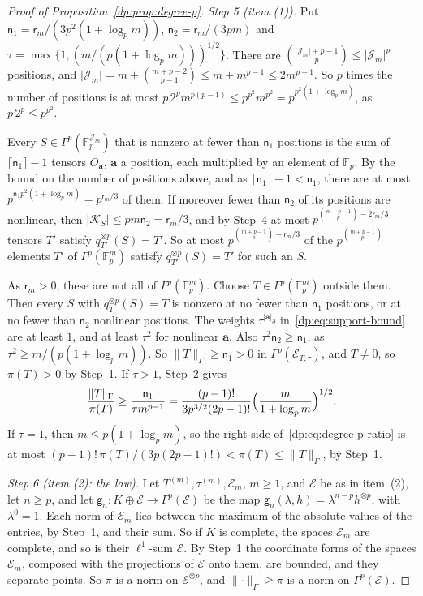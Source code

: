 \documentclass[11pt]{amsart}
\theoremstyle{definition}
\theoremstyle{remark}
\numberwithin{equation}{section}
\newcommand{\F}{\mathbb F}
\newcommand{\abs}[1]{\lvert #1\rvert}
\newcommand{\norm}[1]{\lVert #1\rVert}
\theoremstyle{plain}
\theoremstyle{definition}
\theoremstyle{plain}
\begin{document}
\begin{proof}[Proof of Proposition~\ref{dp:prop:degree-p}]
\emph{Step 5 (item (1)).} Put $\mathsf n_1=\mathsf r_m/(3p^2(1+\log_pm))$, $\mathsf n_2=\mathsf r_m/(3pm)$ and $\tau=\max\{1,(m/(p(1+\log_pm)))^{1/2}\}$. There are $\binom{\abs{\mathcal J_m}+p-1}p\le\abs{\mathcal J_m}^p$ positions, and $\abs{\mathcal J_m}=m+\binom{m+p-2}{p-1}\le m+m^{p-1}\le2m^{p-1}$. So $p$ times the number of positions is at most $p\,2^pm^{p(p-1)}\le p^{p^2}m^{p^2}=p^{p^2(1+\log_pm)}$, as $p\,2^p\le p^{p^2}$.

Every $S\in\Gamma^p(\F_p^{\mathcal J_m})$ that is nonzero at fewer than $\mathsf n_1$ positions is the sum of $\lceil\mathsf n_1\rceil-1$ tensors $O_{\mathbf a}$, $\mathbf a$ a position, each multiplied by an element of $\F_p$. By the bound on the number of positions above, and as $\lceil\mathsf n_1\rceil-1<\mathsf n_1$, there are at most $p^{\mathsf n_1p^2(1+\log_pm)}=p^{\mathsf r_m/3}$ of them. If moreover fewer than $\mathsf n_2$ of its positions are nonlinear, then $\abs{\mathcal K_S}\le pm\mathsf n_2=\mathsf r_m/3$, and by Step~4 at most $p^{\binom{m+p-1}p-2\mathsf r_m/3}$ tensors $T'$ satisfy $q_{T'}^{\otimes p}(S)=T'$. So at most $p^{\binom{m+p-1}p-\mathsf r_m/3}$ of the $p^{\binom{m+p-1}p}$ elements $T'$ of $\Gamma^p(\F_p^m)$ satisfy $q_{T'}^{\otimes p}(S)=T'$ for such an $S$.

As $\mathsf r_m>0$, these are not all of $\Gamma^p(\F_p^m)$. Choose $T\in\Gamma^p(\F_p^m)$ outside them. Then every $S$ with $q_T^{\otimes p}(S)=T$ is nonzero at no fewer than $\mathsf n_1$ positions, or at no fewer than $\mathsf n_2$ nonlinear positions. The weights $\tau^{\abs{\mathbf a}_\partial}$ in~\eqref{dp:eq:support-bound} are at least $1$, and at least $\tau^2$ for nonlinear $\mathbf a$. Also $\tau^2\mathsf n_2\ge\mathsf n_1$, as $\tau^2\ge m/(p(1+\log_pm))$. So $\norm T_\Gamma\ge\mathsf n_1>0$ in $\Gamma^p(\mathcal E_{T,\tau})$, and $T\ne0$, so $\pi(T)>0$ by Step~1. If $\tau>1$, Step~2 gives
\[
 \frac{\norm T_\Gamma}{\pi(T)}\ge\frac{\mathsf n_1}{\tau m^{p-1}}=\frac{(p-1)!}{3p^{3/2}(2p-1)!}\Bigl(\frac m{1+\log_pm}\Bigr)^{1/2}.
\]
If $\tau=1$, then $m\le p(1+\log_pm)$, so the right side of~\eqref{dp:eq:degree-p-ratio} is at most $(p-1)!\,\pi(T)/(3p(2p-1)!)<\pi(T)\le\norm T_\Gamma$, by Step~1.

\emph{Step 6 (item (2): the law).} Let $T^{(m)},\tau^{(m)},\mathcal E_m$, $m\ge1$, and $\mathcal E$ be as in item~(2), let $n\ge p$, and let $\mathsf g_n\colon K\oplus\mathcal E\to\Gamma^p(\mathcal E)$ be the map $\mathsf g_n(\lambda,h)=\lambda^{n-p}h^{\otimes p}$, with $\lambda^0=1$. Each norm of $\mathcal E_m$ lies between the maximum of the absolute values of the entries, by Step~1, and their sum. So if $K$ is complete, the spaces $\mathcal E_m$ are complete, and so is their $\ell^1$-sum $\mathcal E$. By Step~1 the coordinate forms of the spaces $\mathcal E_m$, composed with the projections of $\mathcal E$ onto them, are bounded, and they separate points. So $\pi$ is a norm on $\mathcal E^{\otimes p}$, and $\norm\cdot_\Gamma\ge\pi$ is a norm on $\Gamma^p(\mathcal E)$.


\end{proof}
\end{document}
